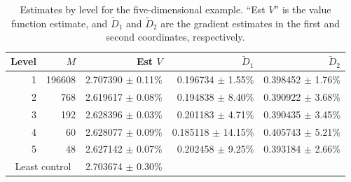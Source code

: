 \documentclass[11pt]{article}
\theoremstyle{definition}
\theoremstyle{plain}
\begin{document}
\begin{table}[t]
  \centering
  \caption{Estimates by level for the five-dimensional example. ``Est $V$'' is the value function estimate, 
  and $\tilde D_1$ and $\tilde D_2$ are the gradient estimates in the first and second coordinates, respectively.}
  \label{tab:five-dim-averages}
  \begin{tabular}{r r r r r}
    \toprule
    Level & $M$ & Est $V$ & $\tilde D_1$ & $\tilde D_2$ \\
    \midrule
    1 & 196608 & 2.707390 $\pm$ 0.11\% & 0.196734 $\pm$ 1.55\% & 0.398452 $\pm$ 1.76\% \\
    2 & 768 & 2.619617 $\pm$ 0.08\% & 0.194838 $\pm$ 8.40\% & 0.390922 $\pm$ 3.68\% \\
    3 & 192 & 2.628396 $\pm$ 0.03\% & 0.201183 $\pm$ 4.71\% & 0.390435 $\pm$ 3.45\% \\
    4 & 60 & 2.628077 $\pm$ 0.09\% & 0.185118 $\pm$ 14.15\% & 0.405743 $\pm$ 5.21\% \\
    5 & 48 & 2.627142 $\pm$ 0.07\% & 0.202458 $\pm$ 9.25\% & 0.393184 $\pm$ 2.66\% \\
    \midrule
    \multicolumn{2}{c}{Least control} & 2.703674 $\pm$ 0.30\% &  &  \\
    \bottomrule
  \end{tabular}
\end{table}
\end{document}
